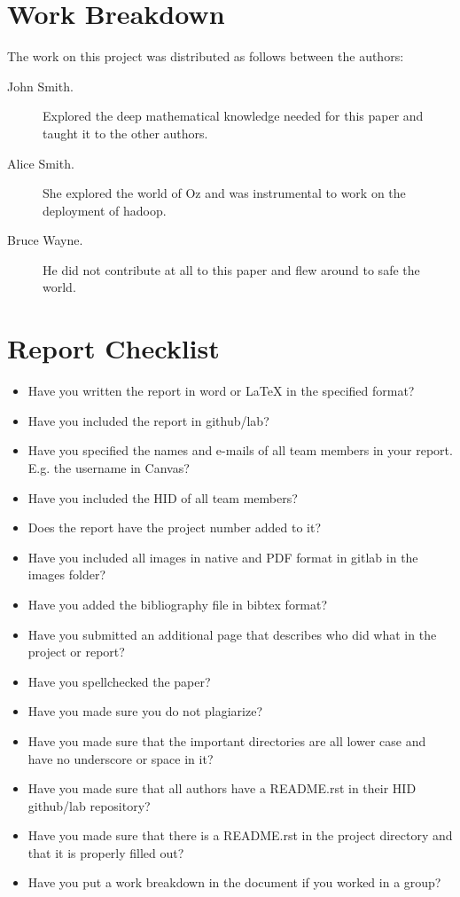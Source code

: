 \documentclass[9pt,twocolumn,twoside]{styles/osajnl}
\begin{document}
\newpage

\appendix

\section{Work Breakdown}

The work on this project was distributed as follows between the
authors:

\begin{description}

\item[John Smith.] Explored the deep mathematical knowledge needed for
  this paper and taught it to the other authors.

\item[Alice Smith.] She explored the world of Oz and was instrumental
  to work on the deployment of hadoop.

\item[Bruce Wayne.] He did not contribute at all to this paper and
  flew around to safe the world.  

\end{description}

\section{Report Checklist}

\begin{itemize}
\renewcommand{\labelitemi}{\scriptsize$\square$} 
\item Have you written the report in word or LaTeX in the specified
  format?
\item Have you included the report in github/lab?
\item Have you specified the names and e-mails of all team members in
  your report. E.g. the username in Canvas?
\item Have you included the HID of all team members?
\item Does the report have the project number added to it?
\item Have you included all images in native and PDF format in gitlab
  in the images folder?
\item Have you added the bibliography file in bibtex format?
\item Have you submitted an additional page that describes who did
  what in the project or report?
\item Have you spellchecked the paper?
\item Have you made sure you do not plagiarize?
\item Have you made sure that the important directories are all lower
  case and have no underscore or space in it?
\item Have you made sure that all authors have a README.rst in their
  HID github/lab repository?
\item Have you made sure that there is a README.rst in the project
  directory and that it is properly filled out?
\item Have you put a work breakdown in the document if you worked in a
  group?
\end{itemize}
\end{document}
